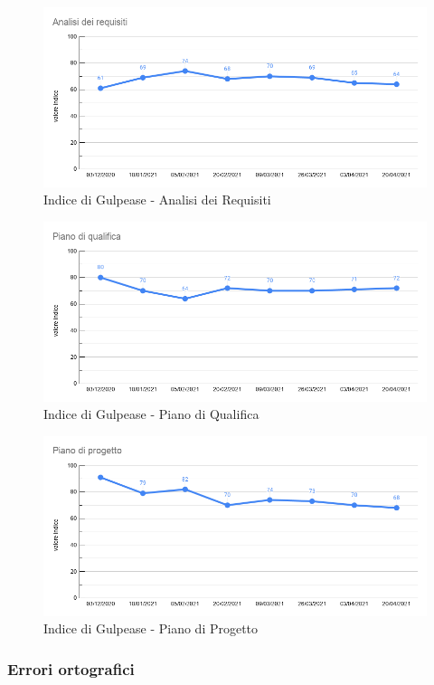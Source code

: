 \begin{figure}[H]
    \centering
    \includegraphics[width=13 cm]{source/sections/images/IdG_AR.png}
    \caption{Indice di Gulpease - Analisi dei Requisiti}
\end{figure}
\begin{figure}[H]
    \centering
    \includegraphics[width=13 cm]{source/sections/images/IdG_PdQ.png}
    \caption{Indice di Gulpease - Piano di Qualifica}
\end{figure}
\begin{figure}[H]
    \centering
    \includegraphics[width=13 cm]{source/sections/images/IdG_PdP.png}
    \caption{Indice di Gulpease - Piano di Progetto}
\end{figure}

\subsubsection{Errori ortografici}

